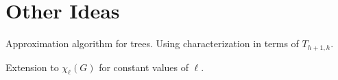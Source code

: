 \documentclass[kpfonts]{patmorin}
\begin{document}
\section{Other Ideas}

Approximation algorithm for trees.  Using characterization in terms of $T_{h+1,h}$.

Extension to $\chi_\ell(G)$ for constant values of $\ell$.















%
%
%
%
%
%
%
%
%
%
%
%
\end{document}
